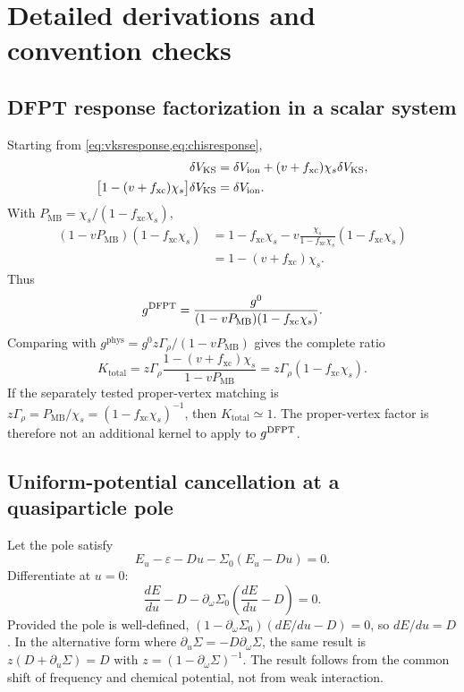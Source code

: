 \section{Detailed derivations and convention checks}
\label{app:derivations}

\subsection{DFPT response factorization in a scalar system}

Starting from \cref{eq:vksresponse,eq:chisresponse},
\begin{align}
  \delta V_{\mathrm{KS}}
  &=\delta V_{\mathrm{ion}}
   +(v+f_{\mathrm{xc}})\chi_s\delta V_{\mathrm{KS}},\\
  \bigl[1-(v+f_{\mathrm{xc}})\chi_s\bigr]\delta V_{\mathrm{KS}}
  &=\delta V_{\mathrm{ion}}.
\end{align}
With $P_{\mathrm{MB}}=\chi_s/(1-f_{\mathrm{xc}}\chi_s)$,
\begin{align}
  (1-vP_{\mathrm{MB}})(1-f_{\mathrm{xc}}\chi_s)
  &=1-f_{\mathrm{xc}}\chi_s
   -v\frac{\chi_s}{1-f_{\mathrm{xc}}\chi_s}
       (1-f_{\mathrm{xc}}\chi_s)\\
  &=1-(v+f_{\mathrm{xc}})\chi_s.
\end{align}
Thus
\begin{equation}
  g^{\mathrm{DFPT}}
  =\frac{g^0}
  {(1-vP_{\mathrm{MB}})(1-f_{\mathrm{xc}}\chi_s)}.
\end{equation}
Comparing with
$g^{\mathrm{phys}}=g^0z\Gamma_\rho/(1-vP_{\mathrm{MB}})$ gives the complete
ratio
\begin{equation}
  K_{\mathrm{total}}
  =z\Gamma_\rho
   \frac{1-(v+f_{\mathrm{xc}})\chi_s}{1-vP_{\mathrm{MB}}}
  =z\Gamma_\rho(1-f_{\mathrm{xc}}\chi_s).
\end{equation}
If the separately tested proper-vertex matching is
$z\Gamma_\rho=P_{\mathrm{MB}}/\chi_s
=(1-f_{\mathrm{xc}}\chi_s)^{-1}$, then
$K_{\mathrm{total}}\simeq1$.  The proper-vertex factor is therefore not an
additional kernel to apply to $g^{\mathrm{DFPT}}$.

\subsection{Uniform-potential cancellation at a quasiparticle pole}

Let the pole satisfy
\begin{equation}
  E_u-\varepsilon-Du-\Sigma_0(E_u-Du)=0.
\end{equation}
Differentiate at $u=0$:
\begin{equation}
  \frac{dE}{du}-D
  -\partial_\omega\Sigma_0\left(\frac{dE}{du}-D\right)=0.
\end{equation}
Provided the pole is well-defined,
$(1-\partial_\omega\Sigma_0)(dE/du-D)=0$, so $dE/du=D$.  In the alternative
form where $\partial_u\Sigma=-D\partial_\omega\Sigma$, the same result is
$z(D+\partial_u\Sigma)=D$ with
$z=(1-\partial_\omega\Sigma)^{-1}$.  The result follows from the common shift of
frequency and chemical potential, not from weak interaction.

